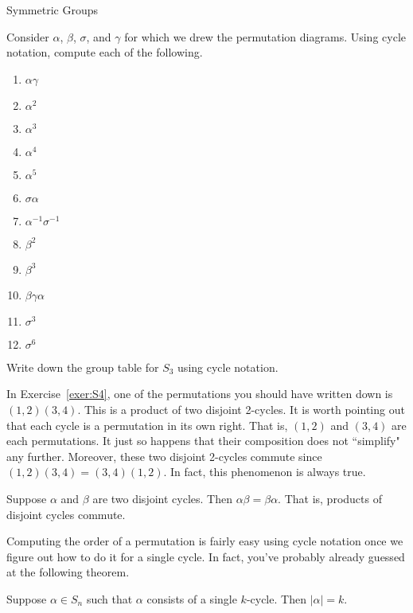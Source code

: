 \begin{section}{Symmetric Groups}
\begin{exercise}
Consider $\alpha$, $\beta$, $\sigma$, and $\gamma$ for which we drew the permutation diagrams.  Using cycle notation, compute each of the following.
\begin{multicols}{2}
\begin{enumerate}[label=\rm{(\alph*)}]
\item $\alpha\gamma$
\item $\alpha^2$
\item $\alpha^3$
\item $\alpha^4$
\item $\alpha^5$
\item $\sigma\alpha$
\item $\alpha^{-1}\sigma^{-1}$
\item $\beta^2$
\item $\beta^3$
\item $\beta\gamma\alpha$
\item $\sigma^3$
\item $\sigma^6$
\end{enumerate}
\end{multicols}
\end{exercise}

\begin{exercise}
Write down the group table for $S_3$ using cycle notation.
\end{exercise}

In Exercise~\ref{exer:S4}, one of the permutations you should have written down is $(1,2)(3,4)$.  This is a product of two disjoint 2-cycles.  It is worth pointing out that each cycle is a permutation in its own right.  That is, $(1,2)$ and $(3,4)$ are each permutations.  It just so happens that their composition does not ``simplify" any further.  Moreover, these two disjoint 2-cycles commute since $(1,2)(3,4)=(3,4)(1,2)$.  In fact, this phenomenon is always true.

\begin{theorem}
Suppose $\alpha$ and $\beta$ are two disjoint cycles.  Then $\alpha\beta=\beta\alpha$.  That is, products of disjoint cycles commute.
\end{theorem}

Computing the order of a permutation is fairly easy using cycle notation once we figure out how to do it for a single cycle.  In fact, you've probably already guessed at the following theorem.

\begin{theorem}
Suppose $\alpha\in S_n$ such that $\alpha$ consists of a single $k$-cycle.  Then $|\alpha|=k$.
\end{theorem}


\end{section}
